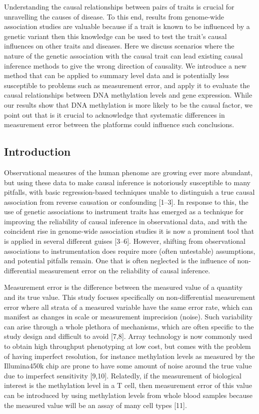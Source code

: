 \documentclass[]{article}
\begin{document}
Understanding the causal relationships between pairs of traits is
crucial for unravelling the causes of disease. To this end, results from
genome-wide association studies are valuable because if a trait is known
to be influenced by a genetic variant then this knowledge can be used to
test the trait's causal influences on other traits and diseases. Here we
discuss scenarios where the nature of the genetic association with the
causal trait can lead existing causal inference methods to give the
wrong direction of causality. We introduce a new method that can be
applied to summary level data and is potentially less susceptible to
problems such as measurement error, and apply it to evaluate the causal
relationships between DNA methylation levels and gene expression. While
our results show that DNA methylation is more likely to be the causal
factor, we point out that is it crucial to acknowledge that systematic
differences in measurement error between the platforms could influence
such conclusions.

\hypertarget{introduction}{%
\subsection{Introduction}\label{introduction}}

Observational measures of the human phenome are growing ever more
abundant, but using these data to make causal inference is notoriously
susceptible to many pitfalls, with basic regression-based techniques
unable to distinguish a true causal association from reverse causation
or confounding {[}1--3{]}. In response to this, the use of genetic
associations to instrument traits has emerged as a technique for
improving the reliability of causal inference in observational data, and
with the coincident rise in genome-wide association studies it is now a
prominent tool that is applied in several different guises {[}3--6{]}.
However, shifting from observational associations to instrumentation
does require more (often untestable) assumptions, and potential pitfalls
remain. One that is often neglected is the influence of non-differential
measurement error on the reliability of causal inference.

Measurement error is the difference between the measured value of a
quantity and its true value. This study focuses specifically on
non-differential measurement error where all strata of a measured
variable have the same error rate, which can manifest as changes in
scale or measurement imprecision (noise). Such variability can arise
through a whole plethora of mechanisms, which are often specific to the
study design and difficult to avoid {[}7,8{]}. Array technology is now
commonly used to obtain high throughput phenotyping at low cost, but
comes with the problem of having imperfect resolution, for instance
methylation levels as measured by the Illumina450k chip are prone to
have some amount of noise around the true value due to imperfect
sensitivity {[}9,10{]}. Relatedly, if the measurement of biological
interest is the methylation level in a T cell, then measurement error of
this value can be introduced by using methylation levels from whole
blood samples because the measured value will be an assay of many cell
types {[}11{]}.
\end{document}
